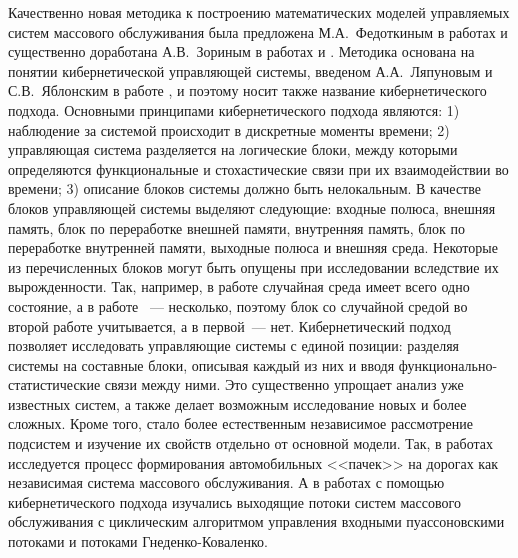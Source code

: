 Качественно новая методика к построению математических моделей управляемых систем массового обслуживания была предложена М.А.~Федоткиным в работах \cite{Fedotkin:1996, fedotkin:1998} и существенно доработана А.В.~Зориным в работах \cite{Zorin:2008:1, Zorin:2014, ZorineDissertation} и \cite{Zorin:2017}. Методика основана на понятии кибернетической управляющей системы, введеном А.А.~Ляпуновым и С.В.~Яблонским в работе \cite{Lyapunov}, и поэтому носит также название кибернетического подхода. Основными принципами кибернетического подхода являются: 1) наблюдение за системой происходит в дискретные моменты времени; 2) управляющая система разделяется на логические блоки, между которыми определяются функциональные и стохастические связи при их взаимодействии во времени; 3) описание блоков системы должно быть нелокальным. В качестве блоков управляющей системы выделяют следующие: входные полюса, внешняя память, блок по переработке внешней памяти, внутренняя память, блок по переработке внутренней памяти, выходные полюса и внешняя среда. Некоторые из перечисленных блоков могут быть опущены при исследовании вследствие их вырожденности. Так, например, в работе \cite{Novgorod:2011} случайная среда имеет всего одно состояние, а в работе \cite{Zorin:2008:1}~--- несколько, поэтому блок со случайной средой во второй работе учитывается, а в первой~--- нет. Кибернетический подход позволяет исследовать управляющие системы с единой позиции: разделяя системы на составные блоки, описывая каждый из них и вводя функционально-статистические связи между ними. Это существенно упрощает анализ уже известных систем, а также делает возможным исследование новых и более сложных. Кроме того, стало более естественным независимое рассмотрение подсистем  и изучение их свойств отдельно от основной модели. Так, в работах \cite{FedotkinRachinskaya, Fedotkin:2012} исследуется процесс формирования автомобильных <<пачек>> на дорогах как независимая система массового обслуживания. А в работах \cite{Proidakova:2008,Fedotkin:2009} с помощью кибернетического подхода изучались выходящие потоки систем массового обслуживания с циклическим алгоритмом управления входными пуассоновскими потоками и потоками Гнеденко-Коваленко. 

